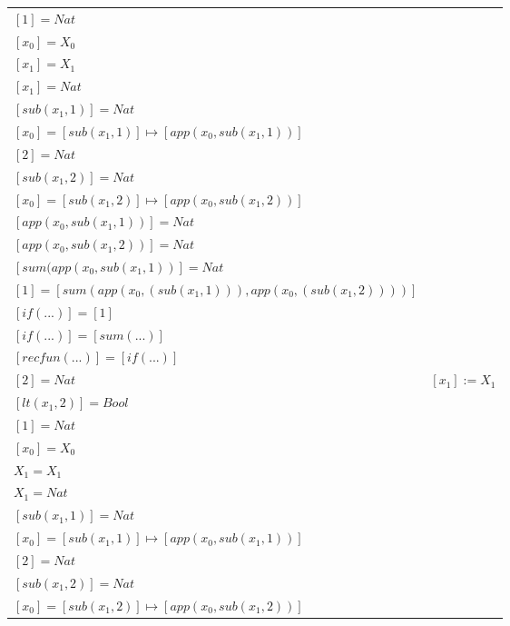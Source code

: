 \begin{exercise}
\begin{description}
\begin{center}
\begin{longtable}{ | l | l | }
                        $[1] = Nat$ & \\
                        $[x_0] = X_0$ & \\
                        $[x_1] = X_1$ & \\
                        $[x_1] = Nat$ & \\
                        $[sub(x_1,1)] = Nat$ & \\
                        $[x_0] = [sub(x_1,1)] \mapsto [app(x_0, sub(x_1,1))]$ & \\
                        $[2] = Nat$ & \\
                        $[sub(x_1,2)] = Nat$ & \\
                        $[x_0] = [sub(x_1,2)] \mapsto [app(x_0, sub(x_1,2))]$ & \\
                        $[app(x_0, sub(x_1,1))] = Nat$ & \\
                        $[app(x_0, sub(x_1,2))] = Nat$ & \\
                        $[sum(app(x_0, sub(x_1,1))] = Nat$ & \\
                        $[1] = [sum(app(x_0, (sub(x_1,1))), app(x_0, (sub(x_1,2))))]$ & \\
                        $[if(...)] = [1]$ & \\
                        $[if(...)] = [sum(...)]$ & \\
                        $[recfun(...)] = [if(...)]$ & \\
                      \hline
                        $[2] = Nat$  & $[x_1] := X_1$ \\
                        $[lt(x_1 , 2)] = Bool$ & \\
                        $[1] = Nat$ & \\
                        $[x_0] = X_0$ & \\
                        $X_1 = X_1$ & \\
                        $X_1 = Nat$ & \\
                        $[sub(x_1,1)] = Nat$ & \\
                        $[x_0] = [sub(x_1,1)] \mapsto [app(x_0, sub(x_1,1))]$ & \\
                        $[2] = Nat$ & \\
                        $[sub(x_1,2)] = Nat$ & \\
                        $[x_0] = [sub(x_1,2)] \mapsto [app(x_0, sub(x_1,2))]$ & \\

\end{longtable}
\end{center}
\end{description}
\end{exercise}
